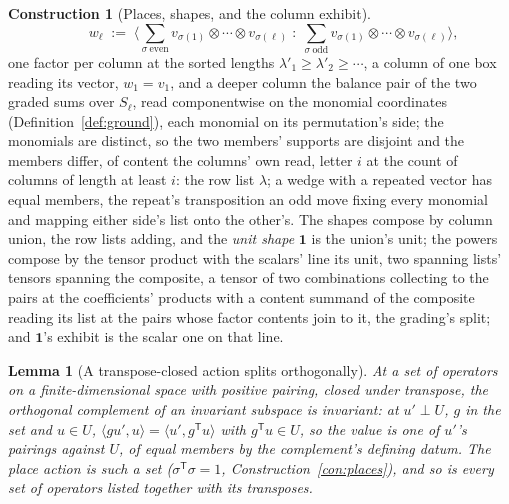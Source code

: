 \documentclass[11pt]{article}
\newtheorem{lemma}{Lemma}
\theoremstyle{definition}
\newtheorem{construction}{Construction}
\begin{document}
\begin{construction}[Places, shapes, and the column exhibit]
\[\qquad
w_\ell\;:=\;\Big\langle
\sum_{\sigma\ \mathrm{even}}
v_{\sigma(1)}\otimes\cdots\otimes v_{\sigma(\ell)}
\;:\;
\sum_{\sigma\ \mathrm{odd}}
v_{\sigma(1)}\otimes\cdots\otimes v_{\sigma(\ell)}
\Big\rangle ,
\]
one factor per column at the sorted lengths
$\lambda'_1\ge\lambda'_2\ge\cdots$, a column of one box reading its
vector, $w_1=v_1$, and a deeper column the balance pair of the two
graded sums over $S_\ell$, read componentwise on the monomial
coordinates (Definition~\ref{def:ground}), each monomial on its
permutation's side; the monomials are distinct, so the two
members' supports are disjoint and the members differ, of
content the columns' own read, letter $i$ at the count of columns
of length at least $i$: the row list $\lambda$; a wedge with a
repeated vector has equal members, the repeat's
transposition an odd move fixing every monomial and mapping either
side's list onto the other's. The shapes compose by column
union, the row lists adding, and the \emph{unit shape}
$\mathbf 1$ is the union's unit; the powers compose by the tensor
product with the scalars' line its unit, two spanning lists'
tensors spanning the composite, a tensor of two combinations
collecting to the pairs at the coefficients' products with a
content summand of the composite reading its list at the pairs
whose factor contents join to it, the grading's split; and
$\mathbf 1$'s exhibit is the scalar one on that line.
\end{construction}

\begin{lemma}[A transpose-closed action splits orthogonally]
\label{lem:orthsplit}
At a set of operators on a finite-dimensional space with positive
pairing, closed under transpose, the orthogonal complement of an
invariant subspace is invariant: at $u'\perp U$, $g$ in the set and
$u\in U$,
$\langle gu',u\rangle=\langle u',g^{\mathsf T}u\rangle$ with
$g^{\mathsf T}u\in U$, so the value is one of $u'$'s pairings against
$U$, of equal members by the complement's defining datum. The place action is such a set
($\sigma^{\mathsf T}\sigma=1$, Construction~\ref{con:places}), and so
is every set of operators listed together with its transposes.
\end{lemma}
\end{document}
